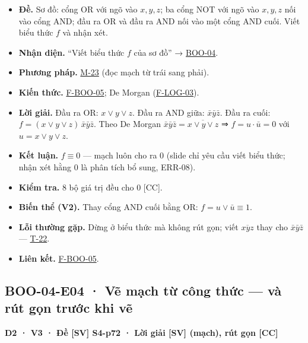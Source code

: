 \documentclass[
  10pt,
  twoside,openany]{book}
\providecommand{\tightlist}{%
  \setlength{\itemsep}{0pt}\setlength{\parskip}{0pt}}
\begin{document}
\begin{itemize}
\tightlist
\item
  \textbf{Đề.} Sơ đồ: cổng OR với ngõ vào \(x,y,z\); ba cổng NOT với ngõ
  vào \(x,y,z\) nối vào cổng AND; đầu ra OR và đầu ra AND nối vào một
  cổng AND cuối. Viết biểu thức \(f\) và nhận xét.
\item
  \textbf{Nhận diện.} ``Viết biểu thức \(f\) của sơ đồ'' →
  \protect\hyperlink{BOO-04}{BOO-04}.
\item
  \textbf{Phương pháp.} \protect\hyperlink{M-23}{M-23} (đọc mạch từ trái
  sang phải).
\item
  \textbf{Kiến thức.} \protect\hyperlink{F-BOO-05}{F-BOO-05}; De Morgan
  (\protect\hyperlink{F-LOG-03}{F-LOG-03}).
\item
  \textbf{Lời giải.} Đầu ra OR: \(x\vee y\vee z\). Đầu ra AND giữa:
  \(\bar x\bar y\bar z\). Đầu ra cuối:
  \(f=(x\vee y\vee z)\,\bar x\bar y\bar z\). Theo De Morgan
  \(\bar x\bar y\bar z=\overline{x\vee y\vee z}\) ⇒ \(f=u\cdot\bar u=0\)
  với \(u=x\vee y\vee z\).
\item
  \textbf{Kết luận.} \(f\equiv0\) --- mạch luôn cho ra 0 (slide chỉ yêu
  cầu viết biểu thức; nhận xét hằng 0 là phân tích bổ sung, ERR-08).
\item
  \textbf{Kiểm tra.} 8 bộ giá trị đều cho 0 {[}CC{]}.
\item
  \textbf{Biến thể (V2).} Thay cổng AND cuối bằng OR:
  \(f=u\vee\bar u\equiv1\).
\item
  \textbf{Lỗi thường gặp.} Dừng ở biểu thức mà không rút gọn; viết
  \(\overline{xyz}\) thay cho \(\bar x\bar y\bar z\) ---
  \protect\hyperlink{T-22}{T-22}.
\item
  \textbf{Liên kết.} \protect\hyperlink{F-BOO-05}{F-BOO-05}.
\end{itemize}

\hypertarget{BOO-04-E04}{%
\subsection{BOO-04-E04 · Vẽ mạch từ công thức --- và rút gọn trước khi
vẽ}\label{BOO-04-E04}}

\textbf{D2 · V3 · Đề {[}SV{]} S4-p72 · Lời giải {[}SV{]} (mạch), rút gọn
{[}CC{]}}
\end{document}
